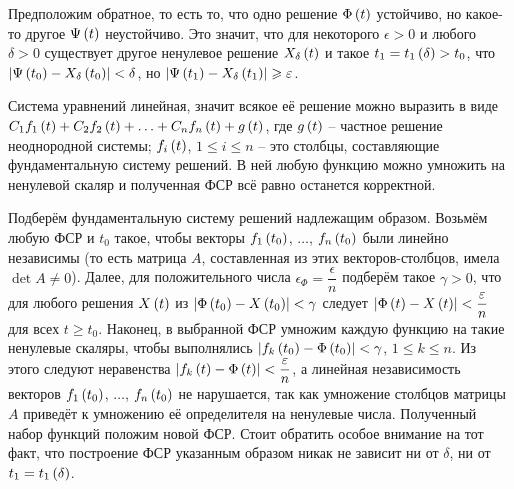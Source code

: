 \documentclass[a5paper,10pt]{article}
\begin{document}
Предположим обратное, то есть то, что одно решение $\Phi\left(t\right)$ устойчиво, но какое-то другое $\Psi\left(t\right)$ неустойчиво. Это значит, что для некоторого $\epsilon > 0$ и любого $\delta > 0$ существует другое ненулевое решение $X_{\delta}\left(t\right)$ и такое $t_{1} = t_{1}\left(\delta\right)> t_{0}$, что $\left|\Psi\left(t_{0}\right) - X_{\delta}\left(t_{0}\right)\right| < \delta$, но $\left|\Psi\left(t_{1}\right) - X_{\delta}\left(t_{1}\right)\right| \geqslant \varepsilon$.

Система уравнений линейная, значит всякое её решение можно выразить в виде 
$C_{1} f_{1}\left(t\right) + C_{2} f_{2}\left(t\right) + \ldots + C_{n} f_{n}\left(t\right) + g\left(t\right)$,
где $g\left(t\right)$ -- частное решение неоднородной системы; $f_{i}\left(t\right)$, $1 \le i \le n$ -- это столбцы,  составляющие фундаментальную систему решений. В ней любую функцию можно умножить на ненулевой скаляр и полученная ФСР всё равно останется корректной.

Подберём фундаментальную систему решений надлежащим образом. Возьмём любую ФСР и $t_{0}$ такое, чтобы векторы $f_{1}\left(t_{0}\right)$, $\ldots$, $f_{n}\left(t_{0}\right)$ были линейно независимы (то есть матрица $A$, составленная из этих векторов-столбцов, имела $\det A \ne 0$). Далее, для положительного числа $\epsilon_{\Phi} = \dfrac {\epsilon} {n}$ подберём такое $\gamma > 0$, что для любого решения $X\left(t\right)$ из $\left|\Phi\left(t_{0}\right) - X\left(t_{0}\right)\right| < \gamma$ следует $\left|\Phi\left(t\right) - X\left(t\right)\right| < \dfrac {\varepsilon} {n}$ для всех $t \ge t_{0}$. Наконец, в выбранной ФСР умножим каждую функцию на такие ненулевые скаляры, чтобы выполнялись $\left|f_{k}\left(t_{0}\right) - \Phi\left(t_{0}\right)\right| < \gamma$, $1 \le k \le n$. Из этого следуют неравенства $\left|f_{k}\left(t\right) - \Phi\left(t\right)\right| < \dfrac {\varepsilon} {n}$, а линейная независимость векторов $f_{1}\left(t_{0}\right)$, $\ldots$, $f_{n}\left(t_{0}\right)$ не нарушается, так как умножение столбцов матрицы $A$ приведёт к умножению её определителя на ненулевые числа. Полученный набор функций положим новой ФСР. Стоит обратить особое внимание на тот факт, что построение ФСР указанным образом никак не зависит ни от $\delta$, ни от $t_{1} = t_{1}\left(\delta\right)$.
\end{document}
